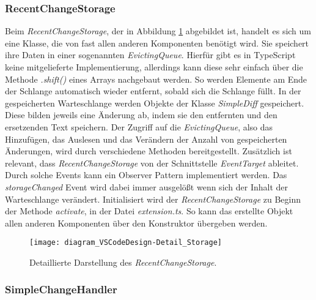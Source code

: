 \subsubsection{RecentChangeStorage}

Beim \emph{RecentChangeStorage}, 
der in Abbildung \ref{fig:diagram_VSCodeDesign-Detail_Storage} abgebildet ist,
handelt es sich um eine Klasse, die
von fast allen anderen Komponenten benötigt wird. Sie speichert ihre
Daten in einer sogenannten \emph{EvictingQueue}. Hierfür gibt es in
TypeScript keine mitgelieferte Implementierung, allerdings kann
diese sehr einfach über die Methode \emph{.shift()} eines Arrays
nachgebaut werden. So werden Elemente am Ende der Schlange automatisch
wieder entfernt, sobald sich die Schlange füllt. 
In der gespeicherten Warteschlange werden
Objekte der Klasse \emph{SimpleDiff} gespeichert. Diese bilden jeweils
eine Änderung ab, indem sie den entfernten und den ersetzenden Text
speichern. Der Zugriff auf die \emph{EvictingQueue}, also das Hinzufügen, 
das Auslesen und das Verändern der Anzahl von gespeicherten
Änderungen, wird durch verschiedene Methoden bereitgestellt.
Zusätzlich ist relevant, dass \emph{RecentChangeStorage} von der
Schnittstelle \emph{EventTarget} ableitet. Durch solche Events
kann ein Observer Pattern implementiert werden. Das \emph{storageChanged}
Event wird dabei immer ausgelößt wenn sich der Inhalt der Warteschlange
verändert. Initialisiert wird der \emph{RecentChangeStorage} zu Beginn der
Methode \emph{activate}, in der Datei \emph{extension.ts}. So kann
das erstellte Objekt allen anderen Komponenten über den Konstruktor
übergeben werden.

\begin{figure}
    \centering
    \texttt{[image: diagram\_VSCodeDesign-Detail\_Storage]}
    \caption{Detaillierte Darstellung des \emph{RecentChangeStorage}.}
    \label{fig:diagram_VSCodeDesign-Detail_Storage}
\end{figure}   

\subsubsection{SimpleChangeHandler}


